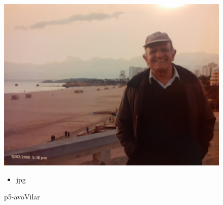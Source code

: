 \documentclass{article}
\begin{document}
		\begin{figure}[ht!]
		\begin{minipage}{0.35\textwidth}
			\centering
			\includegraphics[width=\linewidth]{ManuelVilar/p5-avoVilar.jpg}
			\caption{ p5-avoVilar }
		\end{minipage}
		\hspace{1cm} %
		\begin{minipage}{0.3\textwidth}
			\begin{tcolorbox}[colback=white, colframe=black, boxrule=1pt]
				\begin{itemize}
					\item jpg
                    
				\end{itemize}

			\end{tcolorbox}
		\end{minipage}
	\end{figure}
	
\end{document}
